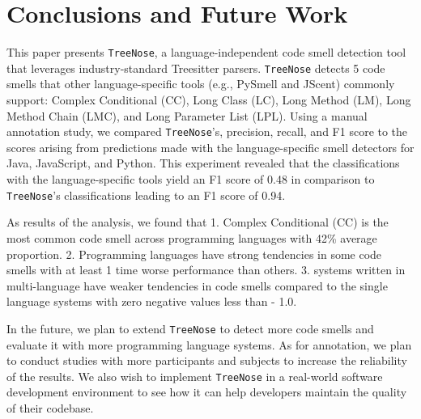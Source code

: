 \section{Conclusions and Future Work}





This paper presents \texttt{TreeNose}, a language-independent code smell
detection tool that leverages industry-standard Treesitter parsers.
\texttt{TreeNose} detects 5 code smells that other language-specific tools
(e.g., PySmell and JScent) commonly support: Complex Conditional (CC), Long
Class (LC), Long Method (LM), Long Method Chain (LMC), and Long Parameter List
(LPL).
%
Using a manual annotation study, we compared \texttt{TreeNose}'s, precision,
recall, and F1 score to the scores arising from predictions made with the
language-specific smell detectors for Java, JavaScript, and Python.
%
This experiment revealed that the classifications with the language-specific
tools yield an F1 score of 0.48 in comparison to \texttt{TreeNose}'s
classifications leading to an F1 score of 0.94.



%
As results of the analysis, we found that 1. Complex Conditional (CC) is the
most common code smell across programming languages with 42\% average
proportion. 2. Programming languages have strong tendencies in some code smells
with at least 1 time worse performance than others. 3. systems written in
multi-language have weaker tendencies in code smells compared to the single
language systems with zero negative values less than - 1.0.

In the future, we plan to extend \texttt{TreeNose} to detect more code smells
and evaluate it with more programming language systems. As for annotation, we
plan to conduct studies with more participants and subjects to increase the
reliability of the results. We also wish to implement \texttt{TreeNose} in a
real-world software development environment to see how it can help developers
maintain the quality of their codebase.
